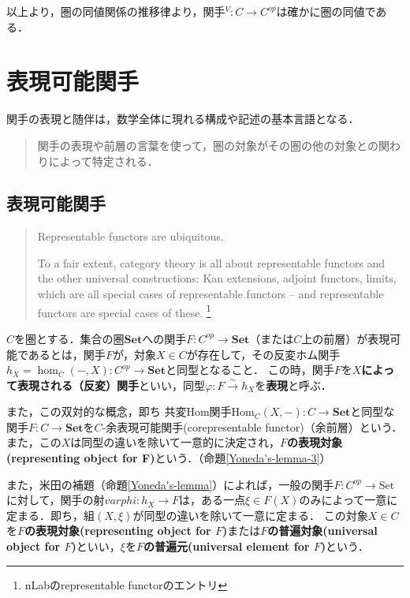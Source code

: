 \documentclass[uplatex, dvipdfmx]{jsreport}
\begin{document}
以上より，圏の同値関係の推移律より，関手${}^V:C\to C^{op}$は確かに圏の同値である．

\chapter{表現可能関手}

関手の表現と随伴は，数学全体に現れる構成や記述の基本言語となる．

\begin{quote}
    関手の表現や前層の言葉を使って，圏の対象がその圏の他の対象との関わりによって特定される．
\end{quote}

\section{表現可能関手}

\begin{quotation}
    Representable functors are ubiquitous.
    
    To a fair extent, category theory is all about representable functors and the other universal constructions: Kan extensions, adjoint functors, limits, which are all special cases of representable functors – and representable functors are special cases of these.
    \footnote{nLabのrepresentable functorのエントリ}
\end{quotation}

\begin{definition}[表現可能関手]\label{def-representable functor}
    $C$を圏とする．集合の圏$\mathbf{Set}$への関手$F:C^{op}\to\mathbf{Set}$（または$C$上の前層）が表現可能であるとは，関手$F$が，対象$X\in C$が存在して，その反変ホム関手$h_X=\hom_C(-,X):C^{op}\to\mathbf{Set}$と同型となること．
    この時，関手$F$を\textbf{$X$によって表現される（反変）関手}といい，同型$\varphi :F\xrightarrow{\sim}h_X$を\textbf{表現}と呼ぶ．
\end{definition}

また，この双対的な概念，即ち
共変Hom関手$\mathrm{Hom}_C(X,-):C\to\mathbf{Set}$と同型な関手$F:C\rightarrow \mathbf{Set}$を$C$-余表現可能関手(corepresentable functor)（余前層）という．
また，この$X$は同型の違いを除いて一意的に決定され，\textbf{$F$の表現対象(representing object for F)}という．（命題\ref{Yoneda's-lemma-3}）

また，米田の補題（命題\ref{Yoneda's-lemma}）によれば，一般の関手$F:C^{op}\to\mathrm{Set}$に対して，関手の射$varphi: h_X\to F$は，ある一点$\xi\in F(X)$のみによって一意に定まる．即ち，組$(X,\xi)$が同型の違いを除いて一意に定まる．
この対象$X\in C$を\textbf{$F$の表現対象(representing object for $F$)}または\textbf{$F$の普遍対象(universal object for $F$)}といい，$\xi$を\textbf{$F$の普遍元(universal element for $F$)}という．
\end{document}

